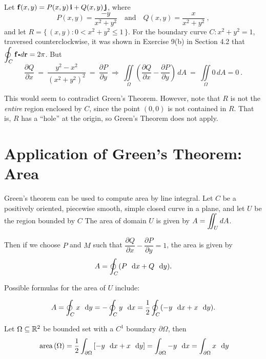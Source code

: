 \begin{exa}\label{exmp:greenhole}
 Let $\mathbf{ f}(x,y) = P(x,y)\,\mathbf{ i} + Q(x,y)\,\mathbf{ j}$, where
 \begin{displaymath}
  P(x,y) = \dfrac{-y}{x^2 + y^2} \quad\text{and}\quad Q(x,y) = \dfrac{x}{x^2 + y^2} ~,
 \end{displaymath}
 and let $R =\lbrace\,(x,y): 0 < x^2 + y^2 \le 1\,\rbrace$. For the boundary curve $C:x^2 + y^2 = 1$, traversed
 counterclockwise, it was shown in Exercise 9(b) in Section 4.2 that $\olineintvec{C}{f}{r} = 2\pi$. But
 \begin{displaymath}
  \dfrac{\partial Q}{\partial x} ~=~ \dfrac{y^2 - x^2}{(x^2 + y^2 )^2} ~=~ \dfrac{\partial P}{\partial y} ~
  \Rightarrow ~
  \iint\limits_{\Omega} \left( \dfrac{\partial Q}{\partial x} - \dfrac{\partial P}{\partial y} \right)\,dA ~=~
  \iint\limits_{\Omega} 0 \,dA = 0~.
 \end{displaymath}
\end{exa}
This would seem to contradict Green's Theorem. However, note that $R$ is not the \emph{entire} region enclosed by $C$,
since the point $(0,0)$ is not contained in $R$. That is, $R$ has a ``hole'' at the origin, so Green's Theorem does not
apply.


\section{Application of Green's Theorem: Area}

Green's theorem can be used to compute area by line integral. 
Let $C$ be a positively oriented, piecewise smooth, simple closed curve in a plane, and let $U$ be the region bounded by $C$
The area of domain $U$ is given by $A = \displaystyle\iint_{U}dA$. 

Then if we choose $P$ and $M$ such that $\dfrac{\partial Q}{\partial x} - \dfrac{\partial P}{\partial y} = 1$, the area is given by
\[A = \doint_{C} (P\, \dx + Q\, \dy).\]

Possible formulas for the area of $U$ include:

\[A=\doint_{C} x\, \dy = -\doint_{C} y\, \dx = \dfrac{1}{2} \doint_{C} (-y\, \dx + x\, \dy).\]



  \begin{corollary} \label{greenarea}
    Let $\Omega \subseteq \mathbb{R}^2$ be  bounded set  with a $C^1$ boundary $\partial \Omega$, then
    \begin{equation*}
      \area{\Omega}
	= \dfrac{1}{2} \dint_{\partial \Omega} \left[ -y \, \dx + x \, \dy \right]
	= \dint_{\partial \Omega} -y \, \dx
	= \dint_{\partial \Omega} x \, \dy
    \end{equation*}
  \end{corollary}
  
